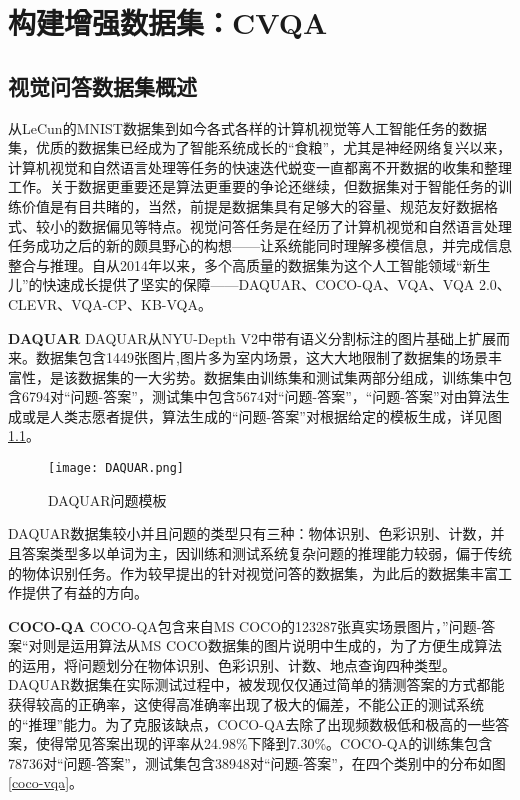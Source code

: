 \chapter{构建增强数据集：CVQA}
\section{视觉问答数据集概述}
从LeCun的MNIST数据集到如今各式各样的计算机视觉等人工智能任务的数据集，优质的数据集已经成为了智能系统成长的“食粮”，尤其是神经网络复兴以来，计算机视觉和自然语言处理等任务的快速迭代蜕变一直都离不开数据的收集和整理工作。关于数据更重要还是算法更重要的争论还继续，但数据集对于智能任务的训练价值是有目共睹的，当然，前提是数据集具有足够大的容量、规范友好数据格式、较小的数据偏见等特点。视觉问答任务是在经历了计算机视觉和自然语言处理任务成功之后的新的颇具野心的构想——让系统能同时理解多模信息，并完成信息整合与推理。自从2014年以来，多个高质量的数据集为这个人工智能领域“新生儿”的快速成长提供了坚实的保障——DAQUAR、COCO-QA、VQA、VQA 2.0、CLEVR、VQA-CP、KB-VQA。

\textbf{DAQUAR}
DAQUAR从NYU-Depth V2中带有语义分割标注的图片基础上扩展而来。数据集包含1449张图片,图片多为室内场景，这大大地限制了数据集的场景丰富性，是该数据集的一大劣势。数据集由训练集和测试集两部分组成，训练集中包含6794对“问题-答案”，测试集中包含5674对“问题-答案”，“问题-答案”对由算法生成或是人类志愿者提供，算法生成的“问题-答案”对根据给定的模板生成，详见图\ref{DAQUAR}。

\begin{figure}[H]
	\texttt{[image: DAQUAR.png]}
	\caption{DAQUAR问题模板}
	\label{DAQUAR}
\end{figure}
DAQUAR数据集较小并且问题的类型只有三种：物体识别、色彩识别、计数，并且答案类型多以单词为主，因训练和测试系统复杂问题的推理能力较弱，偏于传统的物体识别任务。作为较早提出的针对视觉问答的数据集，为此后的数据集丰富工作提供了有益的方向。

\textbf{COCO-QA}
COCO-QA包含来自MS COCO的123287张真实场景图片，”问题-答案“对则是运用算法从MS COCO数据集的图片说明中生成的，为了方便生成算法的运用，将问题划分在物体识别、色彩识别、计数、地点查询四种类型。DAQUAR数据集在实际测试过程中，被发现仅仅通过简单的猜测答案的方式都能获得较高的正确率，这使得高准确率出现了极大的偏差，不能公正的测试系统的“推理”能力。为了克服该缺点，COCO-QA去除了出现频数极低和极高的一些答案，使得常见答案出现的评率从24.98\%下降到7.30\%。COCO-QA的训练集包含78736对“问题-答案”，测试集包含38948对“问题-答案”，在四个类别中的分布如图\ref{coco-vqa}。

